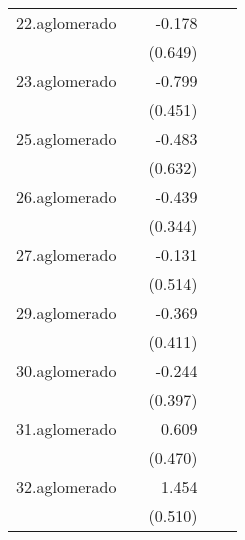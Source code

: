 {\begin{longtable}{l*{4}{D{.}{.}{-1}}}
\addlinespace
22.aglomerado&                     &      -0.178         &                     &                     \\
            &                     &     (0.649)         &                     &                     \\
\addlinespace
23.aglomerado&                     &      -0.799         &                     &                     \\
            &                     &     (0.451)         &                     &                     \\
\addlinespace
25.aglomerado&                     &      -0.483         &                     &                     \\
            &                     &     (0.632)         &                     &                     \\
\addlinespace
26.aglomerado&                     &      -0.439         &                     &                     \\
            &                     &     (0.344)         &                     &                     \\
\addlinespace
27.aglomerado&                     &      -0.131         &                     &                     \\
            &                     &     (0.514)         &                     &                     \\
\addlinespace
29.aglomerado&                     &      -0.369         &                     &                     \\
            &                     &     (0.411)         &                     &                     \\
\addlinespace
30.aglomerado&                     &      -0.244         &                     &                     \\
            &                     &     (0.397)         &                     &                     \\
\addlinespace
31.aglomerado&                     &       0.609         &                     &                     \\
            &                     &     (0.470)         &                     &                     \\
\addlinespace
32.aglomerado&                     &       1.454\sym{**} &                     &                     \\
            &                     &     (0.510)         &                     &                     \\

\end{longtable}}
